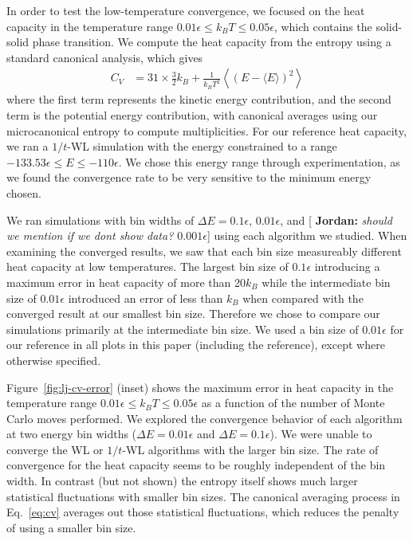 \documentclass[letterpaper,twocolumn,amsmath,amssymb,pre,aps,10pt]{revtex4-1}
\newcommand{\blue}[1]{{\bf \color{blue} #1}}
\newcommand{\jpsays}[1]{{\color{red} [\blue{Jordan:} \emph{#1}]}}
\begin{document}
In order to test the low-temperature convergence, we focused on the
heat capacity in the temperature range $0.01\epsilon \le k_BT \le
0.05\epsilon$, which contains the solid-solid phase transition.
%
We compute the heat capacity from the entropy using a standard
canonical analysis, which gives
\begin{align}
  C_V &= 31\times\frac32k_B + \frac1{k_BT^2}\left< (E- \langle
  E\rangle)^2\right>
  \label{eq:cv}
\end{align}
where the first term represents the kinetic energy contribution, and
the second term is the potential energy contribution, with canonical
averages using our microcanonical entropy to compute multiplicities.
%
For our reference heat capacity, we ran a $1/t$-WL simulation with the
energy constrained to a range $-133.53\epsilon\le E\le -110\epsilon$.
We chose this energy range through experimentation, as we found the
convergence rate to be very sensitive to the minimum energy chosen.

We ran simulations with bin widths of $\Delta E=0.1\epsilon$,
$0.01\epsilon$, and \jpsays{should we mention if we dont show data? $0.001\epsilon$} using each algorithm we studied.
When examining the converged results, we saw that each bin size
measureably different heat capacity at low temperatures. The largest
bin size of $0.1\epsilon$ introducing a maximum error in heat capacity
of more than 20$k_B$ while the intermediate bin size of $0.01\epsilon$
introduced an error of less than $k_B$ when compared with the
converged result at our smallest bin size.  Therefore we chose to
compare our simulations primarily at the intermediate bin size.  We
used a bin size of $0.01\epsilon$ for our reference in all plots in
this paper (including the reference), except where otherwise
specified.

Figure~\ref{fig:lj-cv-error} (inset) shows the maximum error in heat capacity
in the temperature range $0.01\epsilon\le k_BT\le 0.05\epsilon$ as a
function of the number of Monte Carlo moves performed.
%
We explored the convergence behavior of each algorithm at two energy
bin widths ($\Delta E=0.01\epsilon$ and $\Delta E=0.1\epsilon$).  We
were unable to converge the WL or $1/t$-WL algorithms with the larger
bin size.
%
The rate of convergence for the heat capacity seems to be roughly
independent of the bin width.  In contrast (but not shown) the entropy
itself shows much larger statistical fluctuations with smaller bin
sizes.  The canonical averaging process in Eq.~\ref{eq:cv} averages
out those statistical fluctuations, which reduces the penalty of using
a smaller bin size.
\end{document}
